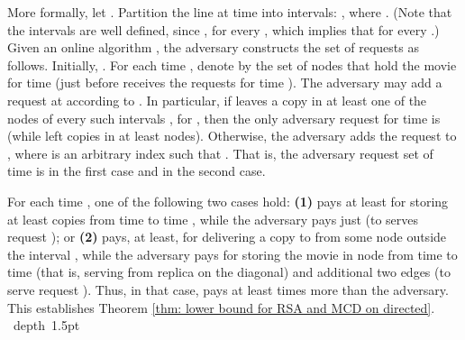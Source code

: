 \documentclass[11pt]{article}
\def\blackslug{\hbox{\hskip 1pt \vrule width 4pt height 8pt
    depth 1.5pt \hskip 1pt}}
\def\QED{\quad\blackslug\lower 8.5pt\null\par}
\begin{document}
More formally, let .
Partition the line at time  into
 intervals:
, where .
(Note that the intervals are well defined, since , for every , which implies that  for every .)
Given an online algorithm , the adversary constructs the set of
requests  as follows.  Initially, .
For each
time , denote by  the set of
nodes that hold the movie for time  (just before  receives
the requests for time ).
The adversary may add a request at  according to .
In particular,
if  leaves a copy in at least one of the nodes of every such intervals , for ,
then the only adversary request for time  is  (while  left copies in at least  nodes).
Otherwise, the adversary adds the request  to , where  is an arbitrary index such that .
That is, the adversary request set of time  is  in the first case and   in the second case.


For each time ,
one of the following two cases hold:
{\bf (1)}
 pays at least  for storing at least  copies from time  to time ,
while the adversary pays just  (to serves request ); or
{\bf (2)}  pays, at least,  for delivering a copy  to  from some node outside the interval ,
while the adversary pays  for storing the movie in node  from time  to time 
(that is, serving from replica  on the diagonal) and additional two edges (to serve request ).
Thus, in that case,  pays at least  times more than the adversary.
This establishes Theorem \ref{thm: lower bound for RSA and MCD on directed}.
\QED
\end{document}
